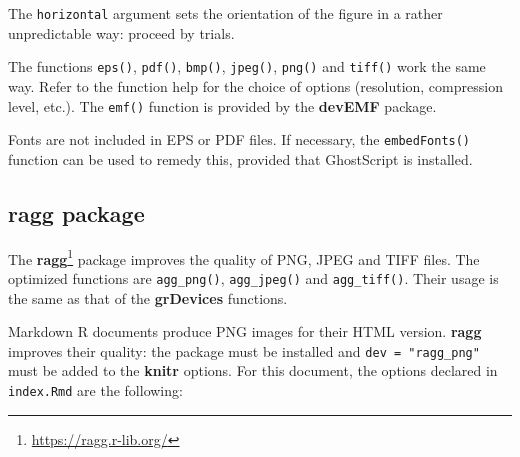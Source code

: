 \documentclass[
  12pt,
  american,
  a4paper,
  extrafontsizes,onecolumn,openright
  ]{memoir}
\newenvironment{Shaded}{\begin{snugshade}}{\end{snugshade}}
\newcommand{\AttributeTok}[1]{\textcolor[rgb]{0.77,0.63,0.00}{#1}}
\newcommand{\CommentTok}[1]{\textcolor[rgb]{0.56,0.35,0.01}{\textit{#1}}}
\newcommand{\ConstantTok}[1]{\textcolor[rgb]{0.00,0.00,0.00}{#1}}
\newcommand{\DecValTok}[1]{\textcolor[rgb]{0.00,0.00,0.81}{#1}}
\newcommand{\FunctionTok}[1]{\textcolor[rgb]{0.00,0.00,0.00}{#1}}
\newcommand{\NormalTok}[1]{#1}
\newcommand{\SpecialCharTok}[1]{\textcolor[rgb]{0.00,0.00,0.00}{#1}}
\newcommand{\StringTok}[1]{\textcolor[rgb]{0.31,0.60,0.02}{#1}}
\begin{document}
The \texttt{horizontal} argument sets the orientation of the figure in a rather unpredictable way: proceed by trials.

The functions \texttt{eps()}, \texttt{pdf()}, \texttt{bmp()}, \texttt{jpeg()}, \texttt{png()} and \texttt{tiff()} work the same way.
Refer to the function help for the choice of options (resolution, compression level, etc.).
The \texttt{emf()} function is provided by the \textbf{devEMF} package.

Fonts are not included in EPS or PDF files.
If necessary, the \texttt{embedFonts()} function can be used to remedy this, provided that GhostScript is installed.

\hypertarget{ragg-package}{%
\subsection{ragg package}\label{ragg-package}}

The \textbf{ragg}\footnote{\url{https://ragg.r-lib.org/}} package improves the quality of PNG, JPEG and TIFF files.
The optimized functions are \texttt{agg\_png()}, \texttt{agg\_jpeg()} and \texttt{agg\_tiff()}.
Their usage is the same as that of the \textbf{grDevices} functions.

Markdown R documents produce PNG images for their HTML version.
\textbf{ragg} improves their quality: the package must be installed and \texttt{dev\ =\ "ragg\_png"} must be added to the \textbf{knitr} options.
For this document, the options declared in \texttt{index.Rmd} are the following:

\scriptsize

\begin{Shaded}
\end{Shaded}
\end{document}
